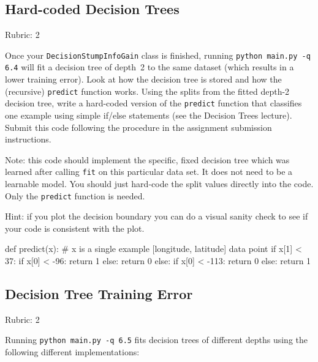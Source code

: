\documentclass{article}
\newcommand{\rubric}[1]{\green{Rubric: #1}}
\newcommand{\blue}[1]{{\color{blue}#1}}
\newcommand{\green}[1]{{\color{green}#1}}
\begin{document}
    \subsection{Hard-coded Decision Trees}
    \rubric{2}

    Once your \texttt{DecisionStumpInfoGain} class is finished, running \texttt{python main.py -q 6.4} will fit
    a decision tree of depth~2 to the same dataset (which results in a lower training error).
    Look at how the decision tree is stored and how the (recursive) \texttt{predict} function works.
    \blue{Using the splits from the fitted depth-2 decision tree, write a hard-coded version of the \texttt{predict}
        function that classifies one example using simple if/else statements
        (see the Decision Trees lecture). Submit this code following the procedure in the assignment submission instructions.}

    Note: this code should implement the specific, fixed decision tree
    which was learned after calling \texttt{fit} on this particular data set. It does not need to be a learnable model.
    You should just hard-code the split values directly into the code.
    Only the \texttt{predict} function is needed.

    Hint: if you plot the decision boundary you can do a visual sanity check to see if your code is consistent with the plot.

    \begin{python}
def predict(x):  # x is a single example [longitude, latitude] data point
    if x[1] < 37:
        if x[0] < -96:
            return 1
        else:
            return 0
    else:
        if x[0] < -113:
            return 0
        else:
            return 1
    \end{python}



    \subsection{Decision Tree Training Error}
    \rubric{2}

    Running \texttt{python main.py -q 6.5} fits decision trees of different depths using the following different implementations:
\end{document}
